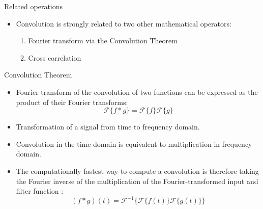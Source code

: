 \begin{vbframe}{Related operations}
    \begin{itemize}
        \item Convolution is strongly related to two other mathematical operators:
        \begin{enumerate}
            \item Fourier transform via the Convolution Theorem
            \item Cross correlation
        \end{enumerate}
    \end{itemize}
\end{vbframe}

\begin{vbframe}{Convolution Theorem}
    \begin{itemize}
        \item  Fourier transform of the convolution of two functions can be expressed as the product of their Fourier transforms:
        $$ 
            \mathcal{F} \{ f\ast g\} = \mathcal{F} \{f\}\mathcal{F} \{g\}
        $$
        \item Transformation of a signal from time to frequency domain.
        \item Convolution in the time domain is equivalent to multiplication in frequency domain.
        \item The computationally fastest way to compute a convolution is therefore taking the Fourier inverse of the multiplication of the Fourier-transformed input and filter function :
        $$
            (f \ast g)(t) = \mathcal{F}^{-1}\{\mathcal{F} \{f(t)\} \mathcal{F} \{g(t)\}\}
        $$
    \end{itemize}
\end{vbframe}


